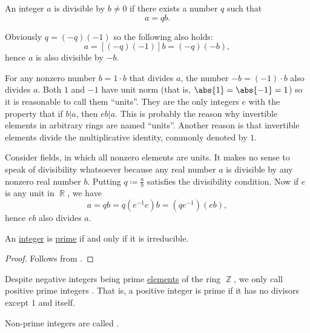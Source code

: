 \begin{remark}\label{rem:units_in_rings_etymology}
  An integer \( a \) is divisible by \( b \neq 0 \) if there exists a number \( q \) such that
  \begin{equation*}
    a = qb.
  \end{equation*}

  Obviously \( q = (-q)(-1) \) so the following also holds:
  \begin{equation*}
    a = [(-q)(-1)]b = (-q)(-b),
  \end{equation*}
  hence \( a \) is also divisible by \( -b \).

  For any nonzero number \( b = 1 \cdot b \) that divides \( a \), the number \( -b = (-1) \cdot b \) also divides \( a \). Both \( 1 \) and \( -1 \) have unit norm (that is, \( \abs{1} = \abs{-1} = 1 \)) so it is reasonable to call them \enquote{units}. They are the only integers \( e \) with the property that if \( b | a \), then \( eb | a \). This is probably the reason why invertible elements in arbitrary rings are named \enquote{units}. Another reason is that invertible elements divide the multiplicative identity, commonly denoted by \( 1 \).

  Consider fields, in which all nonzero elements are units. It makes no sense to speak of divisibility whatsoever because any real number \( a \) is divisible by any nonzero real number \( b \). Putting \( q \coloneqq \frac a b \) satisfies the divisibility condition. Now if \( e \) is any unit in \( \BbbR \), we have
  \begin{equation*}
    a = qb = q(e^{-1} e) b = (qe^{-1}) (eb),
  \end{equation*}
  hence \( eb \) also divides \( a \).
\end{remark}

\begin{lemma}\label{thm:euclids_lemma}
  An \hyperref[def:integers]{integer} is \hyperref[def:prime_ring_ideal]{prime} if and only if it is irreducible.
\end{lemma}
\begin{proof}
  Follows from .
\end{proof}

\begin{definition}\label{def:prime_number}
  Despite negative integers being prime \hyperref[thm:euclids_lemma]{elements} of the ring \( \BbbZ \), we only call positive prime integers . That is, a positive integer is prime if it has no divisors except \( 1 \) and itself.

  Non-prime integers are called .
\end{definition}

